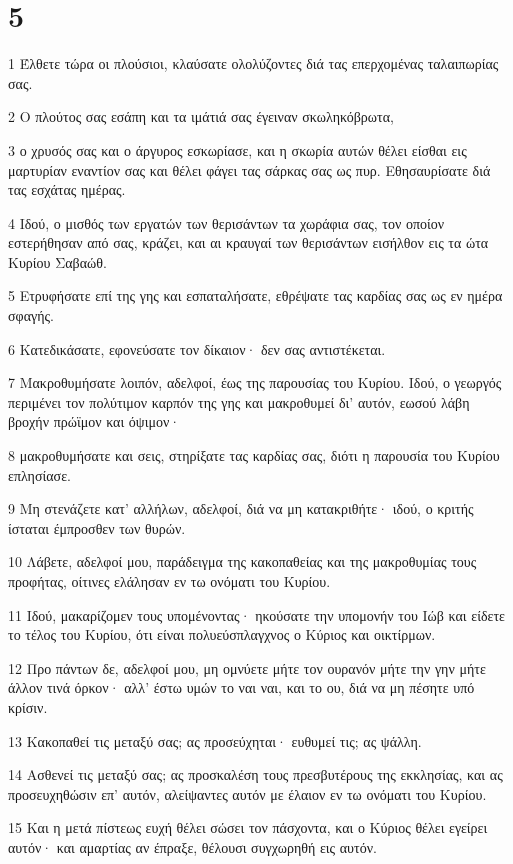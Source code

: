 \chapter{5}

\par 1 Έλθετε τώρα οι πλούσιοι, κλαύσατε ολολύζοντες διά τας επερχομένας ταλαιπωρίας σας.
\par 2 Ο πλούτος σας εσάπη και τα ιμάτιά σας έγειναν σκωληκόβρωτα,
\par 3 ο χρυσός σας και ο άργυρος εσκωρίασε, και η σκωρία αυτών θέλει είσθαι εις μαρτυρίαν εναντίον σας και θέλει φάγει τας σάρκας σας ως πυρ. Εθησαυρίσατε διά τας εσχάτας ημέρας.
\par 4 Ιδού, ο μισθός των εργατών των θερισάντων τα χωράφια σας, τον οποίον εστερήθησαν από σας, κράζει, και αι κραυγαί των θερισάντων εισήλθον εις τα ώτα Κυρίου Σαβαώθ.
\par 5 Ετρυφήσατε επί της γης και εσπαταλήσατε, εθρέψατε τας καρδίας σας ως εν ημέρα σφαγής.
\par 6 Κατεδικάσατε, εφονεύσατε τον δίκαιον· δεν σας αντιστέκεται.
\par 7 Μακροθυμήσατε λοιπόν, αδελφοί, έως της παρουσίας του Κυρίου. Ιδού, ο γεωργός περιμένει τον πολύτιμον καρπόν της γης και μακροθυμεί δι' αυτόν, εωσού λάβη βροχήν πρώϊμον και όψιμον·
\par 8 μακροθυμήσατε και σεις, στηρίξατε τας καρδίας σας, διότι η παρουσία του Κυρίου επλησίασε.
\par 9 Μη στενάζετε κατ' αλλήλων, αδελφοί, διά να μη κατακριθήτε· ιδού, ο κριτής ίσταται έμπροσθεν των θυρών.
\par 10 Λάβετε, αδελφοί μου, παράδειγμα της κακοπαθείας και της μακροθυμίας τους προφήτας, οίτινες ελάλησαν εν τω ονόματι του Κυρίου.
\par 11 Ιδού, μακαρίζομεν τους υπομένοντας· ηκούσατε την υπομονήν του Ιώβ και είδετε το τέλος του Κυρίου, ότι είναι πολυεύσπλαγχνος ο Κύριος και οικτίρμων.
\par 12 Προ πάντων δε, αδελφοί μου, μη ομνύετε μήτε τον ουρανόν μήτε την γην μήτε άλλον τινά όρκον· αλλ' έστω υμών το ναι ναι, και το ου, διά να μη πέσητε υπό κρίσιν.
\par 13 Κακοπαθεί τις μεταξύ σας; ας προσεύχηται· ευθυμεί τις; ας ψάλλη.
\par 14 Ασθενεί τις μεταξύ σας; ας προσκαλέση τους πρεσβυτέρους της εκκλησίας, και ας προσευχηθώσιν επ' αυτόν, αλείψαντες αυτόν με έλαιον εν τω ονόματι του Κυρίου.
\par 15 Και η μετά πίστεως ευχή θέλει σώσει τον πάσχοντα, και ο Κύριος θέλει εγείρει αυτόν· και αμαρτίας αν έπραξε, θέλουσι συγχωρηθή εις αυτόν.
